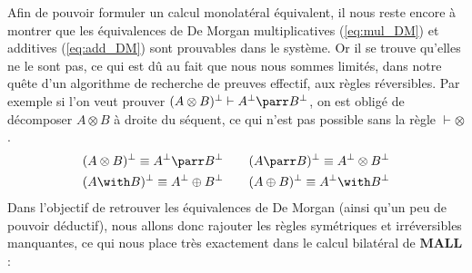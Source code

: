 \documentclass[12pt]{report}
\newcommand{\seq}{\vdash}
\newcommand{\irule}[1]{\footnotesize$#1$}
\newcommand{\iruleL}[1]{\irule{{#1}\seq}}
\newcommand{\iruleR}[1]{\irule{\seq{#1}}}
\begin{document}
Afin de pouvoir formuler un calcul monolatéral équivalent, il nous reste encore à montrer que les équivalences de De Morgan multiplicatives (\ref{eq:mul_DM}) et additives (\ref{eq:add_DM}) sont prouvables dans le système. Or il se trouve qu'elles ne le sont pas, ce qui est dû au fait que nous nous sommes limités, dans notre quête d'un algorithme de recherche de preuves effectif, aux règles réversibles. Par exemple si l'on veut prouver $(A \otimes B)^\bot \seq A^\bot \parr B^\bot$, on est obligé de décomposer $A \otimes B$ à droite du séquent, ce qui n'est pas possible sans la règle {\iruleR{\otimes}}.
\begin{align}
    (A \otimes B)^\bot \equiv A^\bot \parr B^\bot &\qquad (A \parr B)^\bot \equiv A^\bot \otimes B^\bot \label{eq:mul_DM} \\
    (A \with B)^\bot \equiv A^\bot \oplus B^\bot &\qquad (A \oplus B)^\bot \equiv A^\bot \with B^\bot \label{eq:add_DM}
\end{align}
Dans l'objectif de retrouver les équivalences de De Morgan (ainsi qu'un peu de pouvoir déductif), nous allons donc rajouter les règles symétriques et irréversibles manquantes, ce qui nous place très exactement dans le calcul bilatéral de $\mathbf{MALL}$ :

\begin{center}
\end{center}
\end{document}
